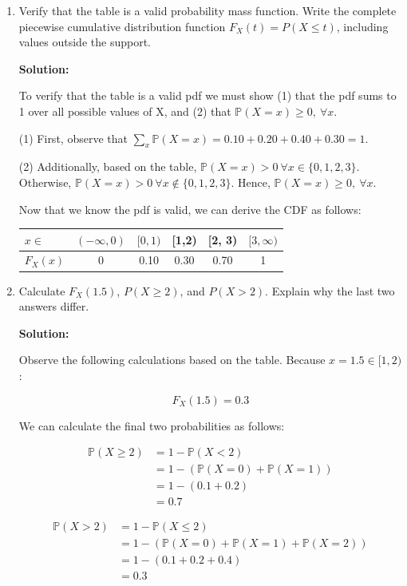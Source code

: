 \documentclass[11pt]{article}
\newcommand{\solution}{\par\medskip\noindent\textbf{Solution:}\par\vspace{0cm}}
\begin{document}
\begin{enumerate}[label=\textbf{(\alph*)}]
  \item Verify that the table is a valid probability mass function. Write the complete piecewise cumulative distribution function $F_X(t) = P(X \leq t)$, including values outside the support.
  \solution

  To verify that the table is a valid pdf we must show (1) that the pdf sums to 1 over all possible values of X, and (2) that $\mathbb{P}(X = x) \geq 0, \ \forall x$.

  (1) First, observe that $\sum_{x} \mathbb{P}(X = x) = 0.10 + 0.20 + 0.40 + 0.30 = 1$.
  
  
  (2) Additionally, based on the table, $\mathbb{P}(X = x) > 0 \ \forall x \in \{0, 1, 2, 3\}$. Otherwise, $\mathbb{P}(X = x) > 0 \ \forall x \notin \{0, 1, 2, 3\}$. Hence, $\mathbb{P}(X = x) \geq 0, \ \forall x$.

  Now that we know the pdf is valid, we can derive the CDF as follows:

  \begin{center}
  \begin{tabular}{lccccc}
  \toprule
  $x \in$ & $(-\infty, 0)$ & $[0, 1)$ & [1,2) & [2, 3) & $[3, \infty)$ \\
  \midrule
  $F_X(x)$ & 0 & 0.10 & 0.30 & 0.70 & 1 \\
  \bottomrule
  \end{tabular}
  \end{center}



  \item Calculate $F_X(1.5)$, $P(X \geq 2)$, and $P(X > 2)$. Explain why the last two answers differ.
  \solution

  Observe the following calculations based on the table. Because $x = 1.5 \in [1, 2)$:

  \[
  F_X(1.5) = 0.3
  \]

  We can calculate the final two probabilities as follows:

  \begin{align*}
    \mathbb{P}(X \geq 2) &= 1 - \mathbb{P}(X < 2) \\
    &= 1 - (\mathbb{P}(X = 0) + \mathbb{P}(X = 1)) \\
    &= 1 - (0.1 + 0.2) \\
    &= 0.7 
  \end{align*}

  \begin{align*}
    \mathbb{P}(X > 2) &= 1 - \mathbb{P}(X \leq 2) \\
    &= 1 - (\mathbb{P}(X = 0) + \mathbb{P}(X = 1) + \mathbb{P}(X = 2)) \\
    &= 1 - (0.1 + 0.2 + 0.4) \\
    &= 0.3
  \end{align*}


\end{enumerate}
\end{document}
